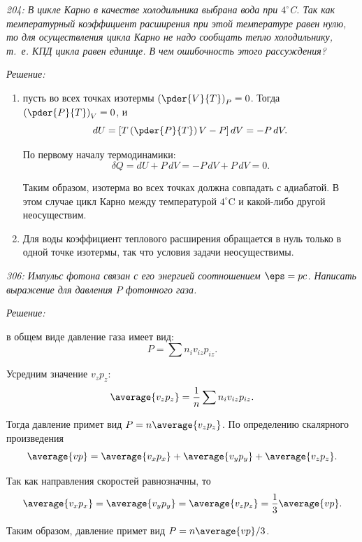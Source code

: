 \documentclass[pscyr]{hedwork}
\begin{document}
\newpage %

\emph{204: В цикле Карно в качестве холодильника выбрана вода при \( 4^\circ\)C.
Так как температурный коэффициент расширения при этой температуре равен нулю, то
для осуществления цикла Карно не надо сообщать тепло холодильнику, т.~е. КПД
цикла равен единице. В чем ошибочность этого рассуждения?}

\vspace*{2em}
\emph{Решение:}
\begin{enumerate}
  \item пусть во всех точках изотермы
  \( \displaystyle \left( \pder{V}{T} \right)_P = 0 \). Тогда
  \( \displaystyle \left( \pder{P}{T} \right)_V = 0 \), и
  \[
    dU = \left[ T\left(\pder{P}{T}\right)V - P \right]dV = -P\,dV.
  \]

  По первому началу термодинамики:
  \[
    \delta Q = dU + P\,dV = -P\,dV + P\,dV = 0.
  \]

  Таким образом, изотерма во всех точках должна совпадать с адиабатой. В этом
  случае цикл Карно между температурой \( 4^\circ\)C и какой-либо другой
  неосуществим.
  \item Для воды коэффициент теплового расширения обращается в нуль только в
  одной точке изотермы, так что условия задачи неосуществимы.
\end{enumerate}

\newpage %

\emph{306: Импульс фотона связан с его энергией соотношением \( \eps = pc \).
Написать выражение для давления \( P \) фотонного газа.}

\vspace*{2em}
\emph{Решение:}

в общем виде давление газа имеет вид:
\[
  P = \sum n_iv_{iz}p_{iz}.
\]

Усредним значение \( v_{z}p_{z} \):
\[
  \average{v_zp_z} = \frac{1}{n}\sum n_iv_{iz}p_{iz}.
\]

Тогда давление примет вид \( P = n\average{v_zp_z} \). По определению скалярного
произведения
\[
  \average{vp} = \average{v_xp_x} + \average{v_yp_y} + \average{v_zp_z}.
\]

Так как направления скоростей равнозначны, то
\[
  \average{v_xp_x} = \average{v_yp_y} = \average{v_zp_z} =
    \frac{1}{3}\average{vp}.
\]

Таким образом, давление примет вид \( P = n\average{vp}/3 \).
\end{document}
